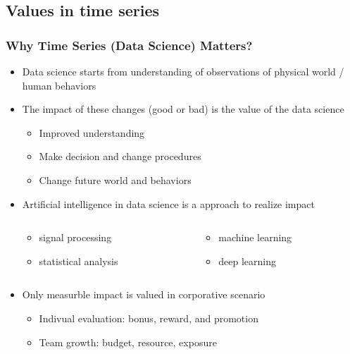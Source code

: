 \documentclass[aspectratio=169,xcolor=x11names,table]{beamer}
\begin{document}

\subsection{Values in time series}
\begin{frame}
	\frametitle{Why Time Series (Data Science) Matters?}
	\large
	\begin{itemize}
		\item Data science starts from understanding of observations of physical world / human behaviors
		\vspace{2mm}
		\item The impact of these changes (good or bad) is the value of the data science
			\begin{itemize}
				\item Improved understanding 
				\item Make decision and change procedures
				\item Change future world and behaviors
			\end{itemize}
		\vspace{2mm}
		\item Artificial intelligence in data science is a approach to realize impact
			\begin{columns}
				\hspace{13mm}
				\begin{column}{0.5\linewidth}
					\begin{itemize}
						\item signal processing
						\item statistical analysis
					\end{itemize}
				\end{column}
				\hfill
				\begin{column}{0.5\linewidth}
					\begin{itemize}
						\item machine learning
						\item deep learning
					\end{itemize}
				\end{column}
			\end{columns}
		\vspace{2mm}
		\item Only measurble impact is valued in corporative scenario
			\begin{itemize}
				\item Indivual evaluation: bonus, reward, and promotion
				\item Team growth: budget, resource, exposure
			\end{itemize}
	\end{itemize}
\end{frame}
\end{document}
